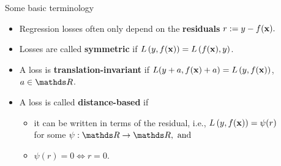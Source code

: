 \documentclass[11pt,compress,t,notes=noshow, xcolor=table]{beamer}
\begin{document}
\begin{vbframe}{Some basic terminology}


\begin{itemize}
  \small
  \item Regression losses often only depend on the \textbf{residuals}
  $r := y - f(\mathbf{x}).$
  \item Losses are called \textbf{symmetric} if $L\left(y, f(\mathbf{x})\right) = L\left(f(\mathbf{x}), y\right)$. 
  \item A loss is \textbf{translation-invariant} if $L(y + a, f(\mathbf{x}) + a) = L\left(y, f(\mathbf{x})\right)$, 
  $a \in \R$.
  \item A loss is called \textbf{distance-based} if
  \begin{itemize}
    \small
    \item it can be written in terms of the residual, i.e., 
    $L\left(y, f(\mathbf{x})\right) = \psi (r)$ \\for some $\psi: \R \to \R, ~ \text{and}$
    \item $\psi(r) = 0 \Leftrightarrow r = 0$.
  \end{itemize}
\end{itemize}

\vfill


\end{vbframe}
\end{document}

